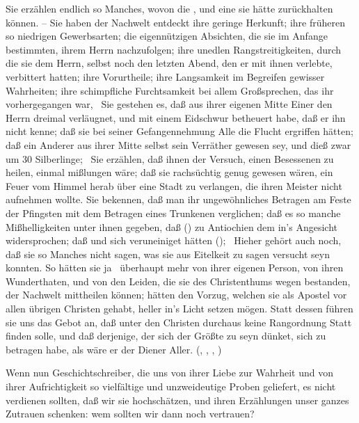 \begin{aufza}
\begin{aufzb}
\item Sie erzählen endlich so Manches, wovon die , und eine  sie hätte zurückhalten können. -- Sie haben der Nachwelt entdeckt ihre geringe Herkunft; ihre früheren so niedrigen Gewerbsarten; die eigennützigen Absichten, die sie im Anfange bestimmten, ihrem Herrn nachzufolgen; ihre unedlen Rangstreitigkeiten, durch die sie dem Herrn, selbst noch den letzten Abend, den er mit ihnen verlebte, verbittert hatten; ihre Vorurtheile; ihre Langsamkeit im Begreifen gewisser Wahrheiten; ihre schimpfliche Furchtsamkeit bei allem Großsprechen, das ihr vorhergegangen war, \usw\ Sie gestehen es, daß aus ihrer eigenen Mitte Einer den Herrn dreimal verläugnet, und mit einem Eidschwur betheuert habe, daß er ihn nicht kenne; daß sie bei seiner Gefangennehmung Alle die Flucht ergriffen hätten; daß ein Anderer aus ihrer Mitte selbst sein Verräther gewesen sey, und dieß zwar um 30 Silberlinge; \usw\ Sie erzählen, daß ihnen der Versuch, einen Besessenen zu heilen, einmal mißlungen wäre; daß sie rachsüchtig genug gewesen wären, ein Feuer vom Himmel herab über eine Stadt zu verlangen, die ihren Meister nicht aufnehmen wollte. Sie bekennen, daß man ihr ungewöhnliches Betragen am Feste der Pfingsten mit dem Betragen eines Trunkenen verglichen; daß es so manche Mißhelligkeiten unter ihnen gegeben, daß ()  zu Antiochien dem  in's Angesicht widersprochen; daß  und  sich veruneiniget hätten (); \usw\ Hieher gehört auch noch, daß sie so Manches nicht sagen, was sie aus Eitelkeit zu sagen versucht seyn konnten. So hätten sie ja \zB\ überhaupt mehr von ihrer eigenen Person, von ihren Wunderthaten, und von den Leiden, die sie des Christenthums wegen bestanden, der Nachwelt mittheilen können; hätten den Vorzug, welchen sie als Apostel vor allen übrigen Christen gehabt, heller in's Licht setzen mögen. Statt dessen führen sie uns das Gebot  an, daß unter den Christen durchaus keine Rangordnung Statt finden solle, und daß derjenige, der sich der Größte zu seyn dünket, sich zu betragen habe, als wäre er der Diener Aller. (, , , )
\end{aufzb}
\item Wenn nun Geschichtschreiber, die uns von ihrer Liebe zur Wahrheit und von ihrer Aufrichtigkeit so vielfältige und unzweideutige Proben geliefert, es nicht verdienen sollten, daß wir sie hochschätzen, und ihren Erzählungen unser ganzes Zutrauen schenken: wem sollten wir dann noch vertrauen?
\end{aufza}

